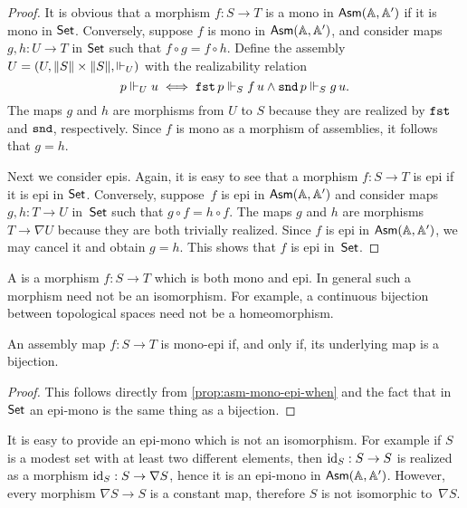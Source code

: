 \begin{proof}
  It is obvious that a morphism $f : S \to T$ is a mono in
  $\AsmA$ if it is mono in $\Set$. Conversely, suppose $f$ is mono in
  $\AsmA$, and consider maps $g, h : U \to T$ in $\Set$ such that $f
  \circ g = f \circ h$. Define the assembly $U = (U, \T{S} \times
  \T{S}, {\rz[U]})$ with the realizability relation
  \begin{equation*}
    p \rz[U] u
    \iff \combFst\,p \rz[S] f\,u \land \combSnd\,p \rz[S] g\,u.
  \end{equation*}
  The maps $g$ and $h$ are morphisms from $U$ to $S$
  because they are realized by $\combFst$ and $\combSnd$,
  respectively. Since $f$ is mono as a morphism of assemblies, it
  follows that $g = h$.

  Next we consider epis. Again, it is easy to see that a morphism
  $f : S \to T$ is epi if it is epi in $\Set$. Conversely, suppose~$f$ is epi
  in $\AsmA$ and consider maps $g, h : T \to U$ in~$\Set$ such that
  $g \circ f = h \circ f$. The maps $g$ and $h$ are morphisms $T \to \nabla U$ because
  they are both trivially realized. Since $f$ is epi in $\AsmA$, we may cancel it and
  obtain $g = h$. This shows that $f$ is epi in~$\Set$.
\end{proof}

A  is a morphism $f : S \to T$ which is both mono and
epi. In general such a morphism need not be an isomorphism. For
example, a continuous bijection between topological spaces need not be
a homeomorphism.

\begin{corollary}
  An assembly map $f : S \to T$ is mono-epi if, and only
  if, its underlying map is a bijection.
\end{corollary}

\begin{proof}
  This follows directly from \cref{prop:asm-mono-epi-when}
  and the fact that in $\Set$ an epi-mono is the same thing as a
  bijection.
\end{proof}

It is easy to provide an epi-mono which is not an isomorphism. For
example if $S$ is a modest set with at least two different
elements, then $\id[S] : S \to S$ is realized as a morphism $\id[S] :
S \to \nabla S$, hence it is an epi-mono in $\AsmA$. However,
every morphism $\nabla S \to S$ is a constant map, therefore
$S$ is not isomorphic to~$\nabla{S}$.

